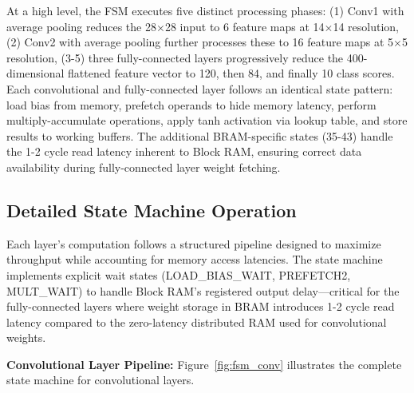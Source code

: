 \documentclass[12pt,a4paper]{report}
\begin{document}
At a high level, the FSM executes five distinct processing phases: (1) Conv1 with average pooling reduces the 28$\times$28 input to 6 feature maps at 14$\times$14 resolution, (2) Conv2 with average pooling further processes these to 16 feature maps at 5$\times$5 resolution, (3-5) three fully-connected layers progressively reduce the 400-dimensional flattened feature vector to 120, then 84, and finally 10 class scores. Each convolutional and fully-connected layer follows an identical state pattern: load bias from memory, prefetch operands to hide memory latency, perform multiply-accumulate operations, apply tanh activation via lookup table, and store results to working buffers. The additional BRAM-specific states (35-43) handle the 1-2 cycle read latency inherent to Block RAM, ensuring correct data availability during fully-connected layer weight fetching.

\subsection{Detailed State Machine Operation}

Each layer's computation follows a structured pipeline designed to maximize throughput while accounting for memory access latencies. The state machine implements explicit wait states (LOAD\_BIAS\_WAIT, PREFETCH2, MULT\_WAIT) to handle Block RAM's registered output delay—critical for the fully-connected layers where weight storage in BRAM introduces 1-2 cycle read latency compared to the zero-latency distributed RAM used for convolutional weights.

\textbf{Convolutional Layer Pipeline:} Figure~\ref{fig:fsm_conv} illustrates the complete state machine for convolutional layers.
\end{document}

